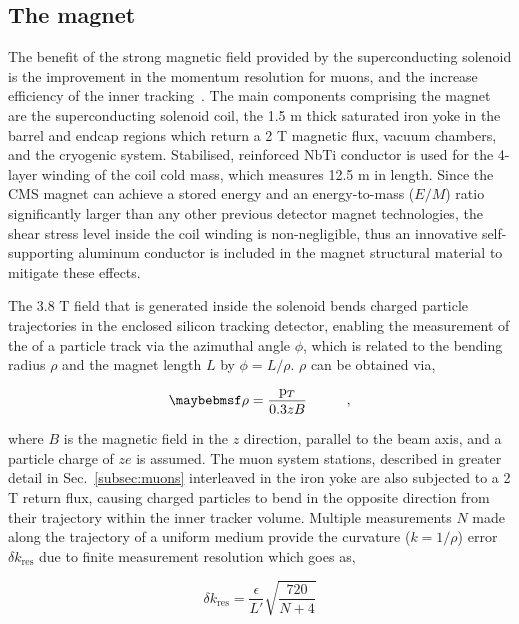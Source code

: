 \subsection{The magnet}
\label{subsec:magnet}

The benefit of the strong magnetic field provided by the superconducting solenoid is the improvement in the momentum resolution for muons, and the increase efficiency of the inner tracking~\cite{tdrmagnet}. The main components comprising the magnet are the superconducting solenoid coil, the 1.5 m thick saturated iron yoke in the barrel and endcap regions which return a 2 T magnetic flux, vacuum chambers, and the cryogenic system. Stabilised, reinforced NbTi conductor is used for the 4-layer winding of the coil cold mass, which measures 12.5 m in length. Since the CMS magnet can achieve a stored energy and an energy-to-mass ($E/M$) ratio significantly larger than any other previous detector magnet technologies, the shear stress level inside the coil winding is non-negligible, thus an innovative self-supporting aluminum conductor is included in the magnet structural material to mitigate these effects. 

The 3.8 T field that is generated inside the solenoid bends charged particle trajectories in the enclosed silicon tracking detector, enabling the measurement of the \pt of a particle track via the azimuthal angle $\phi$, which is related to the bending radius $\rho$ and the magnet length $L$ by $\phi = L/\rho$. $\rho$ can be obtained via,

\begin{equation}
  \rho = \frac{\pt}{0.3zB}\hspace{1cm},
\end{equation} 

where $B$ is the magnetic field in the $z$ direction, parallel to the beam axis, and a particle charge of $ze$ is assumed. The muon system stations, described in greater detail in Sec.~\ref{subsec:muons} interleaved in the iron yoke are also subjected to a 2 T return flux, causing charged particles to bend in the opposite direction from their trajectory within the inner tracker volume. Multiple measurements $N$ made along the trajectory of a uniform medium provide the curvature ($k=1/\rho$) error $\delta k_{\textrm{res}}$ due to finite measurement resolution which goes as,

\begin{equation}
  \delta k_{\textrm{res}} = \frac{\epsilon}{L'}\sqrt{\frac{720}{N+4}}
\end{equation} 

